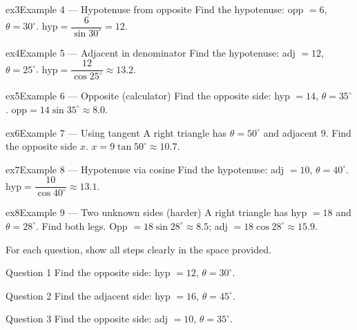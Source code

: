 \documentclass[11pt]{article}
\begin{document}
\begin{example}{ex3}{Example 4 --- Hypotenuse from opposite}
Find the hypotenuse: opp $=6$, $\theta=30^\circ$.
\soln $\text{hyp}=\dfrac{6}{\sin30^\circ}=12.$
\end{example}

\begin{example}{ex4}{Example 5 --- Adjacent in denominator}
Find the hypotenuse: adj $=12$, $\theta=25^\circ$.
\soln $\text{hyp}=\dfrac{12}{\cos25^\circ}\approx13.2.$
\end{example}

\begin{example}{ex5}{Example 6 --- Opposite (calculator)}
Find the opposite side: hyp $=14$, $\theta=35^\circ$.
\soln $\text{opp}=14\sin35^\circ\approx8.0.$
\end{example}

\begin{example}{ex6}{Example 7 --- Using tangent}
A right triangle has $\theta=50^\circ$ and adjacent $9$. Find the opposite side $x$.
\soln $x=9\tan50^\circ\approx10.7.$
\end{example}

\begin{example}{ex7}{Example 8 --- Hypotenuse via cosine}
Find the hypotenuse: adj $=10$, $\theta=40^\circ$.
\soln $\text{hyp}=\dfrac{10}{\cos40^\circ}\approx13.1.$
\end{example}

\begin{example}{ex8}{Example 9 --- Two unknown sides (harder)}
A right triangle has hyp $=18$ and $\theta=28^\circ$. Find both legs.
\soln Opp $=18\sin28^\circ\approx8.5$; adj $=18\cos28^\circ\approx15.9.$
\end{example}

\clearpage
{}
For each question, show all steps clearly in the space provided.

\begin{qbox}{Question 1}
Find the opposite side: hyp $=12$, $\theta=30^\circ$.\workspace{2.0cm}
\end{qbox}

\begin{qbox}{Question 2}
Find the adjacent side: hyp $=16$, $\theta=45^\circ$.\workspace{2.0cm}
\end{qbox}

\begin{qbox}{Question 3}
Find the opposite side: adj $=10$, $\theta=35^\circ$.\workspace{2.0cm}
\end{qbox}
\end{document}
